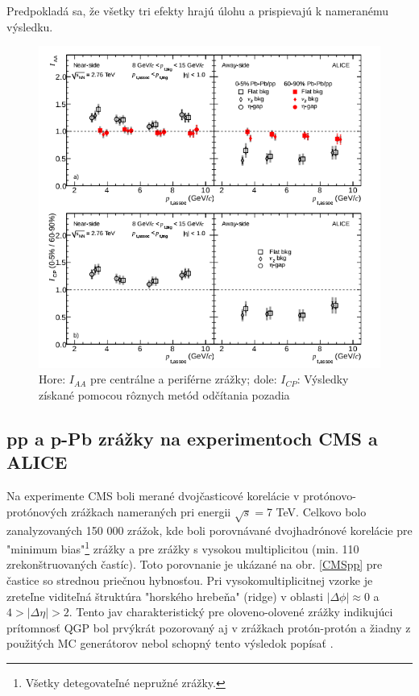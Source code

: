 \documentclass[thesismargins, thesislinespacing]{rnthesis}
\begin{document}
Predpokladá sa, že všetky tri efekty hrajú úlohu a prispievajú k nameranému výsledku.

\begin{figure}[hbtp!]
	\centering
	\includegraphics[scale=0.7]{./Obrazky_praca/clanok2.png}
	\caption{ Hore: $I_{AA}$ pre centrálne a periférne zrážky; dole: $I_{CP}$: Výsledky získané pomocou rôznych metód odčítania pozadia~\cite{clanok}}
	\label{clanok2}
\end{figure}

\subsection{pp a p-Pb zrážky na experimentoch CMS a ALICE}
\label{textAliceCms}
Na experimente CMS boli merané dvojčasticové korelácie v protónovo-protónových zrážkach nameraných pri energii $\sqrt{s}=$7 TeV. Celkovo bolo zanalyzovaných 150 000 zrážok, kde boli porovnávané dvojhadrónové korelácie pre "minimum bias"\footnote{Všetky detegovateľné nepružné zrážky.} zrážky a pre zrážky s vysokou multiplicitou (min. 110 zrekonštruovaných častíc). Toto porovnanie je ukázané na obr. \ref{CMSpp} pre častice so strednou priečnou hybnosťou. Pri vysokomultiplicitnej vzorke je zreteľne viditeľná štruktúra "horského hrebeňa" (ridge) v oblasti $|\Delta \phi|\approx0$ a $4>|\Delta \eta|>2$. Tento jav charakteristický pre oloveno-olovené zrážky indikujúci prítomnosť QGP bol prvýkrát pozorovaný aj v zrážkach protón-protón a žiadny z použitých MC generátorov nebol schopný tento výsledok popísať \cite{CMSpp}. 
\end{document}
